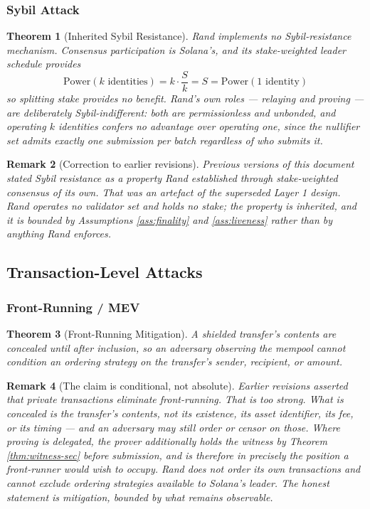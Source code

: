 \documentclass[11pt,a4paper]{article}
\newtheorem{theorem}{Theorem}[section]
\newtheorem{remark}[theorem]{Remark}
\begin{document}
\subsubsection{Sybil Attack}

\begin{theorem}[Inherited Sybil Resistance]
Rand implements no Sybil-resistance mechanism. Consensus participation is Solana's, and its stake-weighted leader schedule provides
\[
\text{Power}(k \text{ identities}) = k \cdot \frac{S}{k} = S = \text{Power}(1 \text{ identity})
\]
so splitting stake provides no benefit. Rand's own roles --- relaying and proving --- are deliberately Sybil-indifferent: both are permissionless and unbonded, and operating $k$ identities confers no advantage over operating one, since the nullifier set admits exactly one submission per batch regardless of who submits it.
\end{theorem}

\begin{remark}[Correction to earlier revisions]
Previous versions of this document stated Sybil resistance as a property Rand established through stake-weighted consensus of its own. That was an artefact of the superseded Layer 1 design. Rand operates no validator set and holds no stake; the property is inherited, and it is bounded by Assumptions \ref{ass:finality} and \ref{ass:liveness} rather than by anything Rand enforces.
\end{remark}

\subsection{Transaction-Level Attacks}

\subsubsection{Front-Running / MEV}

\begin{theorem}[Front-Running Mitigation]
A shielded transfer's contents are concealed until after inclusion, so an adversary observing the mempool cannot condition an ordering strategy on the transfer's sender, recipient, or amount.
\end{theorem}

\begin{remark}[The claim is conditional, not absolute]
Earlier revisions asserted that private transactions \emph{eliminate} front-running. That is too strong. What is concealed is the transfer's contents, not its existence, its asset identifier, its fee, or its timing --- and an adversary may still order or censor on those. Where proving is delegated, the prover additionally holds the witness by Theorem \ref{thm:witness-sec} before submission, and is therefore in precisely the position a front-runner would wish to occupy. Rand does not order its own transactions and cannot exclude ordering strategies available to Solana's leader. The honest statement is mitigation, bounded by what remains observable.
\end{remark}
\end{document}
